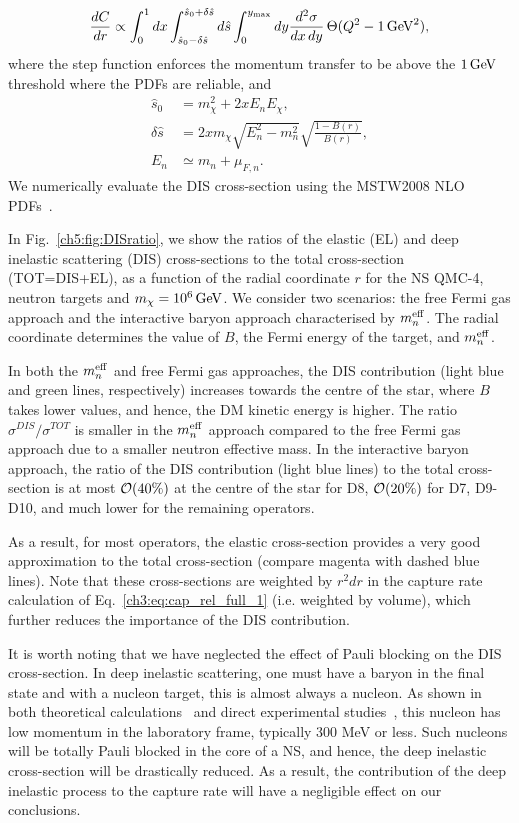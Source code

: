 \begin{align}
   \frac{dC}{dr}\propto \int_0^1 dx\int_{\hat{s}_0-\delta\hat{s}}^{\hat{s}_0+\delta\hat{s}}d\hat{s}\int_0^{y_\mathrm{max}}dy  \frac{d^2\sigma}{dx\, dy} \,\Theta(Q^2 -1{\rm \,GeV}^2), \label{eq:DIS}
\end{align}
where the step function enforces the momentum transfer to be above the $1{\rm \,GeV}$ threshold where the PDFs are reliable, and 
\begin{align}
    \hat{s}_0 & = m_\chi^2 + 2x E_n E_\chi,\\
    \delta\hat{s} & = 2xm_\chi \sqrt{E_n^2 -m_n^2}\sqrt{\frac{1-B(r)}{B(r)}},\\
    E_n & \simeq m_n + \mu_{F,n}. 
\end{align}
We numerically evaluate the DIS cross-section using the MSTW2008 NLO PDFs~\cite{Martin:2009iq_PartondistributionsLHC}. 

In Fig.~\ref{ch5:fig:DISratio}, we show the ratios of the elastic (EL) and deep inelastic scattering (DIS) cross-sections
to the total cross-section (TOT=DIS+EL),  as a function of the radial coordinate $r$ for the NS  QMC-4, neutron targets and $m_\chi=10^6{\rm \,GeV}$. We consider two scenarios: the free Fermi gas approach and the interactive baryon approach characterised by $m_n^{\rm eff}$. The radial coordinate determines the value of $B$, the Fermi energy of the target, and $m_n^{\rm eff}$. 

In both the $m_n^{\rm eff}$ and free Fermi gas approaches, the DIS contribution (light blue and green lines, respectively) increases towards the centre of the star, where $B$ takes lower values, and hence, the DM kinetic energy is higher. The ratio $\sigma^{DIS}/\sigma^{TOT}$ is smaller in the $m_n^{\rm eff}$ approach compared to the free Fermi gas approach due to a smaller neutron effective mass. In the interactive baryon approach, the ratio of the DIS contribution (light blue lines) to the total cross-section is at most ${\cal O}(40\%)$ at the centre of the star for D8, ${\cal O}(20\%)$ for D7, D9-D10, and much lower for the remaining operators.  

As a result, for most operators, the elastic cross-section provides a very good approximation to the total cross-section (compare magenta with dashed blue lines).
Note that these cross-sections are weighted by $r^2dr$ in the capture rate calculation of Eq.~\ref{ch3:eq:cap_rel_full_1} (i.e. weighted by volume), which further reduces the importance of the DIS contribution. 

It is worth noting that we have neglected the effect of Pauli blocking on the DIS cross-section. In deep inelastic scattering, one must have a baryon in the final state and with a nucleon target, this is almost always a nucleon. As shown in both theoretical calculations~\cite{Melnitchouk:1992gd_Protonproductionbias} and direct experimental studies~\cite{BEBCWA59:1989ayi_Backwardparticleproduction}, this nucleon has low momentum in the laboratory frame, typically 300 MeV or less. Such nucleons will be totally Pauli blocked in the core of a NS, and hence, the deep inelastic cross-section will be drastically reduced. 
As a result, the contribution of the deep inelastic process to the capture rate will have a negligible effect on our conclusions. 

